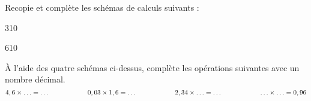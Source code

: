 Recopie et complète les schémas de calculs suivants :
\vspace{1cm}\par
\begin{center}
  3{10}\kern2cm
\par\vspace{3cm}\par
{}\kern2cm6{10}
\end{center}
\par\vspace{1cm}\par
\`A l'aide des quatre schémas ci-dessus, complète les opérations suivantes avec un nombre décimal.
\[4,6\times\ldots=\ldots\kern2cm0,03\times1,6=\ldots\kern2cm 2,34\times\ldots=\ldots\kern2cm\ldots\times\ldots=0,96\]